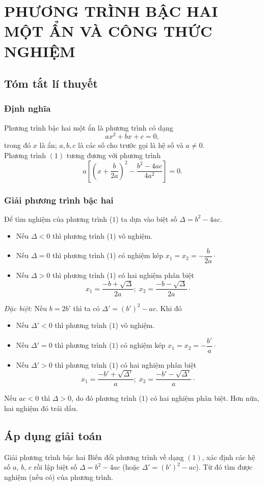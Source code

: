 
\section{PHƯƠNG TRÌNH BẬC HAI MỘT ẨN VÀ CÔNG THỨC NGHIỆM}

\subsection{Tóm tắt lí thuyết}
\subsubsection{Định nghĩa}
Phương trình bậc hai một ẩn là phương trình có dạng \[ax^2+bx+c=0,
\tag{1}\]
trong đó $x$ là ẩn; $a,b,c$ là các số cho trước gọi là hệ số và $a\ne 0$.\\
 Phương trình $(1)$ tương đương với phương trình \[a\left[\left(x+\dfrac{b}{2a}\right)^2-\dfrac{b^2-4ac}{4a^2}\right]=0.\tag{2}\]
\subsubsection{Giải phương trình bậc hai}
Để tìm nghiệm của phương trình ($1$) ta dựa vào biệt số $\Delta=b^2-4ac$.
\begin{itemize}
\item Nếu $\Delta<0$ thì phương trình ($1$) vô nghiệm.
\item Nếu $\Delta=0$ thì phương trình ($1$) có nghiệm kép $x_1=x_2=-\dfrac{b}{2a}\cdot$
\item Nếu $\Delta>0$ thì phương trình ($1$) có hai nghiệm phân biệt $$x_1=\dfrac{-b+\sqrt{\Delta}}{2a};\; x_2=\dfrac{-b-\sqrt{\Delta}}{2a}\cdot$$
\end{itemize}
\textit{Đặc biệt}: Nếu $b=2b'$ thì ta có $\Delta'=\left(b'\right)^2-ac$. Khi đó
\begin{itemize}
\item Nếu $\Delta'<0$ thì phương trình ($1$) vô nghiệm.
\item Nếu $\Delta'=0$ thì phương trình ($1$) có nghiệm kép $x_1=x_2=-\dfrac{b'}{a}\cdot$
\item Nếu $\Delta'>0$ thì phương trình ($1$) có hai nghiệm phân biệt $$x_1=\dfrac{-b'+\sqrt{\Delta'}}{a};\; x_2=\dfrac{-b'-\sqrt{\Delta'}}{a}\cdot$$
\end{itemize}
 Nếu $ac<0$ thì $\Delta>0$, do đó phương trình ($1$) có hai nghiệm phân biệt. Hơn nữa, hai nghiệm đó trái dấu.

\subsection{Áp dụng giải toán}
\begin{dang}{Giải phương trình bậc hai}
	Biến đổi phương trình về dạng $(1)$, xác định các hệ số $a$, $b$, $c$ rồi lập biệt số $\Delta=b^2-4ac$ (hoặc $\Delta'=\left(b'\right)^2-ac$). Từ đó tìm được nghiệm (nếu có) của phương trình.
\end{dang}

